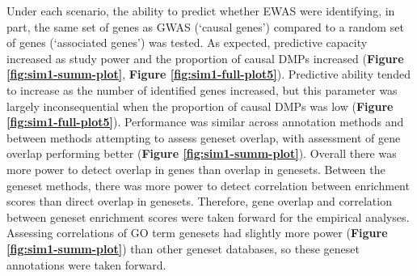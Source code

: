 \documentclass[11pt,oneside]{bristolthesis}
\begin{document}
Under each scenario, the ability to predict whether EWAS were identifying, in part, the same set of genes as GWAS (`causal genes') compared to a random set of genes (`associated genes') was tested. As expected, predictive capacity increased as study power and the proportion of causal DMPs increased (\textbf{Figure \ref{fig:sim1-summ-plot}}, \textbf{Figure \ref{fig:sim1-full-plot5}}). Predictive ability tended to increase as the number of identified genes increased, but this parameter was largely inconsequential when the proportion of causal DMPs was low (\textbf{Figure \ref{fig:sim1-full-plot5}}). Performance was similar across annotation methods and between methods attempting to assess geneset overlap, with assessment of gene overlap performing better (\textbf{Figure \ref{fig:sim1-summ-plot}}). Overall there was more power to detect overlap in genes than overlap in genesets. Between the geneset methods, there was more power to detect correlation between enrichment scores than direct overlap in genesets. Therefore, gene overlap and correlation between geneset enrichment scores were taken forward for the empirical analyses. Assessing correlations of GO term genesets had slightly more power (\textbf{Figure \ref{fig:sim1-summ-plot}}) than other geneset databases, so these geneset annotations were taken forward.
\end{document}
